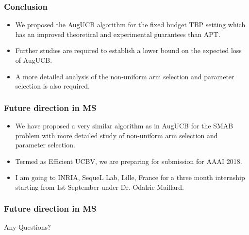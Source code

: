 \begin{frame}
\frametitle{Conclusion}
\begin{itemize}
\item<1-> We proposed the AugUCB algorithm for the fixed budget TBP setting which has an improved theoretical and experimental guarantees than APT.
\item<2-> Further studies are required to establish a lower bound on the expected loss of AugUCB.
\item<3-> A more detailed analysis of the non-uniform arm selection and parameter selection is also required.
\end{itemize}
\end{frame}

\begin{frame}
\frametitle{Future direction in MS}
\begin{itemize}
\item<1-> We have proposed a very similar algorithm as in AugUCB for the SMAB problem with more detailed study of non-uniform arm selection and parameter selection.
\item<2-> Termed as Efficient UCBV, we are preparing for submission for AAAI 2018.
\item<3-> I am going to INRIA, SequeL Lab, Lille, France for a three month internship starting from 1st September under Dr. Odalric Maillard.
\end{itemize}
\end{frame}

\begin{frame}
\frametitle{Future direction in MS}
\Huge{\centerline{Any Questions? }}

\end{frame}